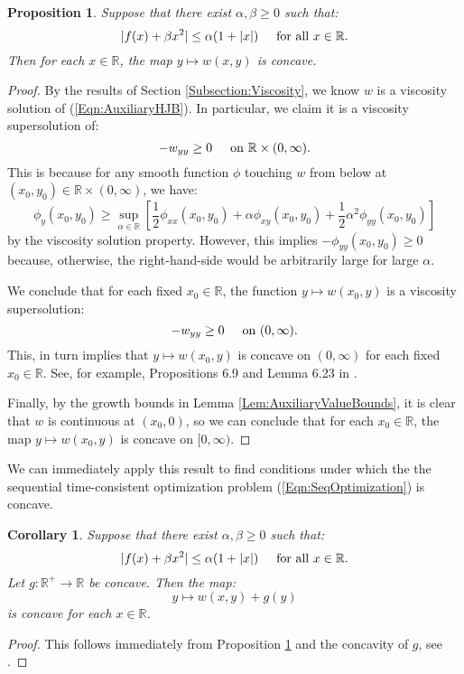 \documentclass[11pt]{article}
\newtheorem{cor}{Corollary}
\newtheorem{prop}{Proposition}
\begin{document}
\begin{prop}\label{Prop:ConcaveValueFunction}
Suppose that there exist $\alpha,\beta\geq 0$ such that:
\[|f(x)+\beta x^2|\leq\alpha(1+|x|)\hspace{0.5cm}\text{for all }x\in\mathbb{R}.\] 
Then for each $x\in\mathbb{R}$, the map $y\mapsto w(x,y)$ is concave.\end{prop}
\begin{proof}
By the results of Section \ref{Subsection:Viscosity}, we know $w$ is a viscosity solution of (\ref{Eqn:AuxiliaryHJB}). In particular, we claim it is a viscosity supersolution of:
\[-w_{yy}\geq 0\hspace{0.5cm}\text{on }\mathbb{R}\times(0,\infty).\]
This is because for any smooth function $\phi$ touching $w$ from below at $(x_0,y_0)\in\mathbb{R}\times(0,\infty)$, we have:
\[\phi_y(x_0,y_0)\geq\sup\limits_{\alpha\in\mathbb{R}}\left[\frac{1}{2}\phi_{xx}(x_0,y_0)+\alpha\phi_{xy}(x_0,y_0)+\frac{1}{2}\alpha^2\phi_{yy}(x_0,y_0)\right]\]
by the viscosity solution property. However, this implies $-\phi_{yy}(x_0,y_0)\geq 0$ because, otherwise, the right-hand-side would be arbitrarily large for large $\alpha$.

We conclude that for each fixed $x_0\in\mathbb{R}$, the function $y\mapsto w(x_0,y)$ is a viscosity supersolution:
\[-w_{yy}\geq 0\hspace{0.5cm}\text{on }(0,\infty).\]
This, in turn implies that $y\mapsto w(x_0,y)$ is concave on $(0,\infty)$ for each fixed $x_0\in\mathbb{R}$. See, for example, Propositions 6.9 and Lemma 6.23 in \cite{Touzi2013}.

Finally, by the growth bounds in Lemma \ref{Lem:AuxiliaryValueBounds}, it is clear that $w$ is continuous at $(x_0,0)$, so we can conclude that for each $x_0\in\mathbb{R}$, the map $y\mapsto w(x_0,y)$ is concave on $[0,\infty)$.
\end{proof}

We can immediately apply this result to find conditions under which the the sequential time-consistent optimization problem (\ref{Eqn:SeqOptimization}) is concave.

\begin{cor}\label{Cor:Concavity}Suppose that there exist $\alpha,\beta\geq 0$ such that:
\[|f(x)+\beta x^2|\leq\alpha(1+|x|)\hspace{0.5cm}\text{for all }x\in\mathbb{R}.\]
Let $g:\mathbb{R}^+\to\mathbb{R}$ be concave. Then the map:
\[y\mapsto w(x,y)+g(y)\]
is concave for each $x\in\mathbb{R}$.\end{cor}
\begin{proof}This follows immediately from Proposition \ref{Prop:ConcaveValueFunction} and the concavity of $g$, see \cite{Boyd2004}.\end{proof}
\end{document}
